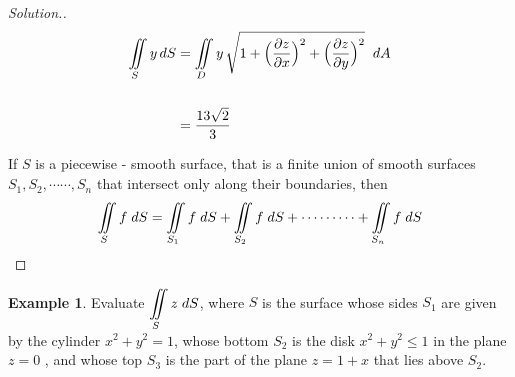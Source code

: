 \documentclass[11pt,a4paper]{article}
\theoremstyle{definition}
\newtheorem{exa}[thm]{Example}
\newenvironment{solution}
  {\renewcommand{\qedsymbol}{}\begin{proof}[\textit{Solution}.]}
  {\end{proof}}
\begin{document}
\begin{solution}
\begin{align*}
\iint\limits_Sy\, dS & = \iint\limits_D y \,\sqrt{1 + \Big(\dfrac{\partial z}{\partial x}\Big)^2 + \Big(\dfrac{\partial z}{\partial y}\Big)^2}\hspace{0.2cm}dA\\\\ 
& = \frac{13\sqrt{2}}{3}\\
\end{align*}

If $S$ is a piecewise - smooth surface, that is a finite union of smooth surfaces $S_1, S_2,\cdots\cdots, S_n$ that intersect only along their boundaries, then $$\iint\limits_{S} f \hspace{0.1cm}dS = \iint\limits_{S_1}f\hspace{0.1cm}dS + \iint\limits_{S_2}f\hspace{0.1cm}dS + \cdots\cdots\cdots +\iint\limits_{S_n}f\hspace{0.1cm}dS $$
\end{solution}


\begin{exa}


Evaluate $\displaystyle{\iint\limits_S z\hspace{0.1cm}dS}$, where $S$ is the surface whose sides $S_1$ are given by the cylinder $x^2 + y^2 =1$, whose bottom $S_2$ is the disk $x^2 + y^2 \leq 1$ in the plane $z =0$ , and whose top $S_3$ is the part of the plane $z = 1 + x$ that lies above $S_2$.
\end{exa}
\end{document}
